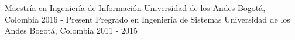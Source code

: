 

\begin{cventries}

\vspace{-1cm}
\cventry{}{}{}{}{}
\noindent
\cventry
{Maestría en Ingeniería de Información} %
{Universidad de los Andes} %
{Bogotá, Colombia} %
{2016 - Present} %
{}
\cventry
{Pregrado en Ingeniería de Sistemas} %
{Universidad de los Andes} %
{Bogotá, Colombia} %
{2011 - 2015} %
{}

\vspace{-0.5cm}
\end{cventries}
